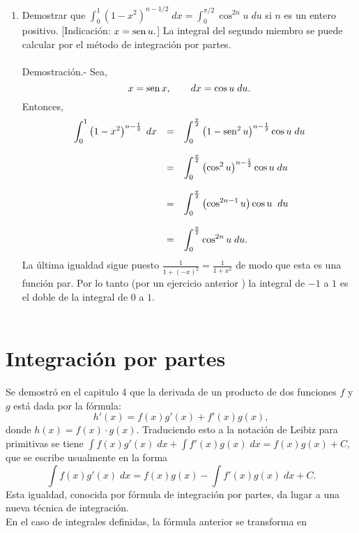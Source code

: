 \begin{enumerate}[\bfseries 1.]
	\item Demostrar que $\int_0^1 (1-x^2)^{n-1/2}\; dx = \int_0^{\pi/2}\cos^{2n}u\; du$ si $n$ es un entero positivo. [Indicación: $x=\mathop{\mbox{\normalfont sen}}\nolimits u.$] La integral del segundo miembro se puede calcular por el método de integración por partes.\\\\
	    Demostración.-\; Sea,
	    $$x=\mathop{\mbox{\normalfont sen}}\nolimits x,\qquad dx=\cos u\; du.$$
	    Entonces,
	    $$\begin{array}{rcl}
		\displaystyle\int_0^1 \left(1-x^2\right)^{n-\frac{1}{2}}\; dx &=& \displaystyle\int_0^{\frac{\pi}{2}} \left(1-\mathop{\mbox{\normalfont sen}}\nolimits^2 u\right)^{n-\frac{1}{2}} \cos u\; du\\\\
									      &=&\displaystyle \int_0^{\frac{\pi}{2}}\left(\cos^2 u\right)^{n-\frac{1}{2}} \cos u \; du\\\\
									      &=&\displaystyle\int_0^{\frac{\pi}{2}} \left(\cos^{2n-1}u\right)\cos u\; \; du\\\\
									      &=&\displaystyle\int_0^{\frac{\pi}{2}} \cos^{2n}u\; du.
	    \end{array}$$
	    La última igualdad sigue puesto $\frac{1}{1+(-x)^2} = \frac{1}{1+x^2}$ de modo que esta es una función par. Por lo tanto (por un ejercicio anterior ) la integral de $-1$ a $1$ es el doble de la integral de $0$ a $1$.\\\\

\end{enumerate}


\section{Integración por partes}

Se demostró en el capitulo 4 que la derivada de un producto de dos funciones $f$ y $g$ está dada por la fórmula:
$$h'(x)=f(x)g'(x)+f'(x)g(x),$$
donde $h(x)=f(x)\cdot g(x).$ Traduciendo esto a la notación de Leibiz para primitivas se tiene $\int f(x)g'(x)\; dx + \int f'(x)g(x)\; dx=f(x)g(x)+C$, que se escribe usualmente en la forma
$$\int f(x)g'(x)\; dx = f(x)g(x)-\int f'(x)g(x)\; dx + C.$$
Esta igualdad, conocida por fórmula de integración por partes, da lugar a una nueva técnica de integración.\\

En el caso de integrales definidas, la fórmula anterior se transforma en


